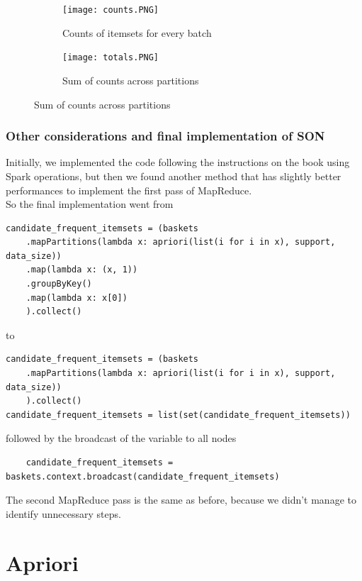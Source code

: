 \documentclass[a4paper]{article}
\begin{document}
	\begin{figure}[h]
		\centering
		
		\begin{subfigure}[b]{0.4\textwidth}
			\centering
			\texttt{[image: counts.PNG]}
         	\caption{Counts of itemsets for every batch}
         	\label{fig:counts}
		\end{subfigure}
		\hfill
		\begin{subfigure}[b]{0.4\textwidth}
			\centering
			\texttt{[image: totals.PNG]}
         	\caption{Sum of counts across partitions}
         	\label{fig:totals}
		\end{subfigure}
	\end{figure}
	
	
	\subsubsection{Other considerations and final implementation of SON}
	Initially, we implemented the code following the instructions on the book using Spark operations, but then we found another method that has slightly better performances to implement the first
	pass of MapReduce.\\
	So the final implementation went from
	\begin{lstlisting}
candidate_frequent_itemsets = (baskets
    .mapPartitions(lambda x: apriori(list(i for i in x), support, data_size))
    .map(lambda x: (x, 1))                                             
    .groupByKey()                                                      
    .map(lambda x: x[0])                                               
    ).collect()
\end{lstlisting}
to
	\begin{lstlisting}
candidate_frequent_itemsets = (baskets
    .mapPartitions(lambda x: apriori(list(i for i in x), support, data_size))
    ).collect()
candidate_frequent_itemsets = list(set(candidate_frequent_itemsets))
\end{lstlisting}
followed by the broadcast of the variable to all nodes
\begin{lstlisting}
	candidate_frequent_itemsets = baskets.context.broadcast(candidate_frequent_itemsets)
\end{lstlisting}
	
	The second MapReduce pass is the same as before, because we didn't manage to identify unnecessary steps.

	\newpage
	
	\section{Apriori}
	\label{section:apriori}
	
\end{document}
